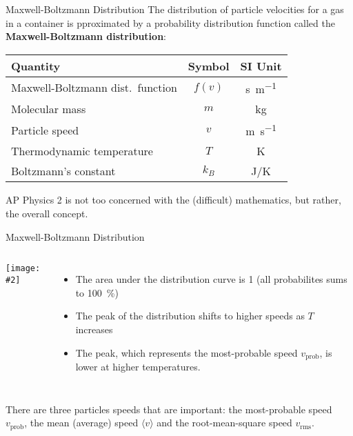 \documentclass[12pt,aspectratio=169]{beamer}
\newcommand{\pic}[2]{\texttt{[image: \#2]}}
\newcommand{\eq}[2]{\vspace{#1}{\Large\begin{displaymath}#2\end{displaymath}}}
\begin{document}
\begin{frame}{Maxwell-Boltzmann Distribution}
  The distribution of particle velocities for a gas in a container is
  pproximated by a probability distribution function called the
  \textbf{Maxwell-Boltzmann distribution}:

  \eq{-.2in}{
    f(v)=4\pi\left[\frac{m}{2\pi k_BT}\right]^{\frac{3}{2}}v^2
    \exp\left[-\frac{mv^2}{2k_BT}\right]
  }

  \begin{center}
    \begin{tabular}{l|c|c}
      \rowcolor{pink}
      \textbf{Quantity} & \textbf{Symbol} & \textbf{SI Unit} \\ \hline
      Maxwell-Boltzmann dist.\ function & $f(v)$ &\si{\second\per\metre}\\
      Molecular mass            & $m$        & \si{\kilo\gram} \\
      Particle speed            & $v$        & \si{\metre\per\second} \\
      Thermodynamic temperature & $T$        & \si{\kelvin} \\
      Boltzmann's constant      & $k_B$      & \si{\joule/\kelvin}
    \end{tabular}
  \end{center}
  AP Physics 2 is not too concerned with the (difficult) mathematics,
  but rather, the overall concept.
\end{frame}



\begin{frame}{Maxwell-Boltzmann Distribution}
  \vspace{.15in}\begin{columns}
    \centering
    \pic{1.05}{maxwell-boltzmann.png}
    
    \begin{itemize}
    \item The area under the distribution curve is 1 (all probabilites sums to
      \SI{100}{\percent})
    \item The peak of the distribution shifts to higher speeds as $T$ increases
    \item The peak, which represents the most-probable speed $v_\mathrm{prob}$,
      is lower at higher temperatures.
    \end{itemize}
  \end{columns}
  \vspace{.2in}There are three particles speeds that are important: the
  most-probable speed $v_\mathrm{prob}$, the mean (average) speed
  $\langle v \rangle$ and the root-mean-square speed $v_\mathrm{rms}$.
\end{frame}
\end{document}
